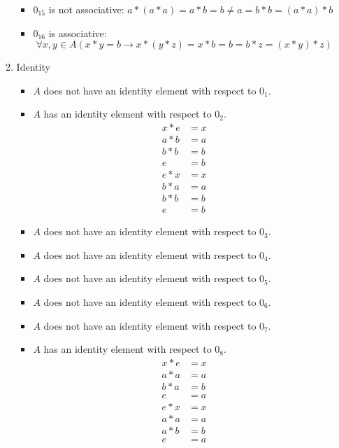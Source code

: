 \begin{enumerate}[label={\Alph*.},font={\bfseries}]
\begin{enumerate}[label={\arabic*},font={\bfseries}]
\begin{itemize}
          \item $0_{15}$ is not associative: $a*(a*a)=a*b=b \neq a=b*b=(a*a)*b$
          \item $0_{16}$ is associative:
            $$\forall x,y \in A (x*y=b \to x*(y*z)=x*b=b=b*z=(x*y)*z)$$
        \end{itemize}
      \item Identity
        \begin{itemize}
          \item $A$ does not have an identity element with respect to $0_1$.
          \item $A$ has an identity element with respect to $0_2$.
            \begin{align*}
              x*e &= x \\
              a*b &= a \\
              b*b &= b \\
              e &= b \\
              e*x &= x \\
              b*a &= a \\
              b*b &= b \\
              e &= b
            \end{align*}
          \item $A$ does not have an identity element with respect to $0_3$.
          \item $A$ does not have an identity element with respect to $0_4$.
          \item $A$ does not have an identity element with respect to $0_5$.
          \item $A$ does not have an identity element with respect to $0_6$.
          \item $A$ does not have an identity element with respect to $0_7$.
          \item $A$ has an identity element with respect to $0_8$.
            \begin{align*}
              x*e &= x \\
              a*a &= a \\
              b*a &= b \\
              e &= a \\
              e*x &= x \\
              a*a &= a \\
              a*b &= b \\
              e &= a
            \end{align*}

\end{itemize}
\end{enumerate}
\end{enumerate}
